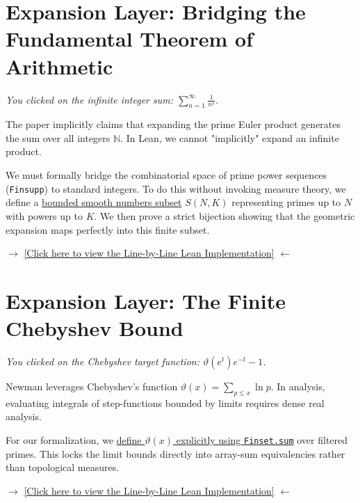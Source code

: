 \documentclass[12pt]{article}
\begin{document}
\newpage
\section*{Expansion Layer: Bridging the Fundamental Theorem of Arithmetic}
\label{layer2:fta}

\textit{You clicked on the infinite integer sum: $\sum_{n=1}^\infty \frac{1}{n^s}$.}

The paper implicitly claims that expanding the prime Euler product generates the sum over all integers $\mathbb{N}$. In Lean, we cannot "implicitly" expand an infinite product.

We must formally bridge the combinatorial space of prime power sequences (\texttt{Finsupp}) to standard integers. To do this without invoking measure theory, we define a \hyperref[layer3:fta]{bounded smooth numbers subset} $S(N,K)$ representing primes up to $N$ with powers up to $K$. We then prove a strict bijection showing that the geometric expansion maps perfectly into this finite subset.

\begin{center}
    $\to$ \hyperref[layer3:fta]{[Click here to view the Line-by-Line Lean Implementation]} $\leftarrow$
\end{center}

\newpage
\section*{Expansion Layer: The Finite Chebyshev Bound}
\label{layer2:chebyshev}

\textit{You clicked on the Chebyshev target function: $\vartheta(e^t)e^{-t} - 1$.}

Newman leverages Chebyshev's function $\vartheta(x) = \sum_{p \le x} \ln p$. In analysis, evaluating integrals of step-functions bounded by limits requires dense real analysis.

For our formalization, we \hyperref[layer3:chebyshev]{define $\vartheta(x)$ explicitly using \texttt{Finset.sum}} over filtered primes. This locks the limit bounds directly into array-sum equivalencies rather than topological measures.

\begin{center}
    $\to$ \hyperref[layer3:chebyshev]{[Click here to view the Line-by-Line Lean Implementation]} $\leftarrow$
\end{center}
\end{document}
